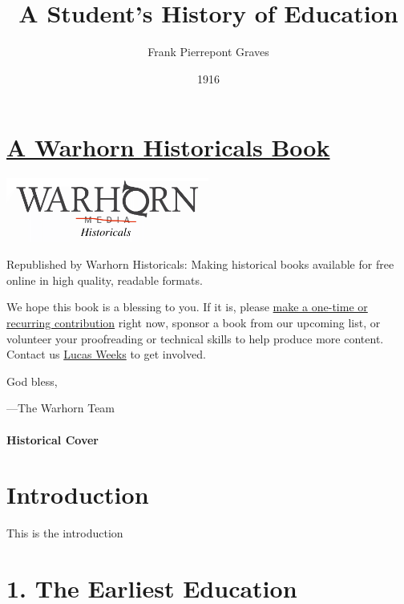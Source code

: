 \documentclass[]{book}
\title{A Student's History of Education}
\author{Frank Pierrepont Graves}
\date{1916}
\begin{document}
\maketitle

{
\setcounter{tocdepth}{1}
\tableofcontents
}
\hypertarget{a-warhorn-historicals-book}{%
\chapter*{\texorpdfstring{\href{https://historicals.warhornmedia.com/}{A Warhorn Historicals Book}}{A Warhorn Historicals Book}}\label{a-warhorn-historicals-book}}

\includegraphics[width=0.5\textwidth,height=\textheight]{images/warhornlogo.png}

Republished by Warhorn Historicals:
Making historical books available for free online in high quality, readable formats.

We hope this book is a blessing to you. If it is, please \href{https://warhornmedia.com/give}{make a one-time or recurring contribution} right now, sponsor a book from our upcoming list, or volunteer your proofreading or technical skills to help produce more content. Contact us \href{mailto:lucas@beggarsborn.com}{Lucas Weeks} to get involved.

God bless,

---The Warhorn Team

\hypertarget{historical-cover}{%
\subsubsection*{Historical Cover}\label{historical-cover}}

\hypertarget{introduction}{%
\chapter*{Introduction}\label{introduction}}

This is the introduction

\hypertarget{the-earliest-education}{%
\chapter{1. The Earliest Education}\label{the-earliest-education}}
\end{document}
